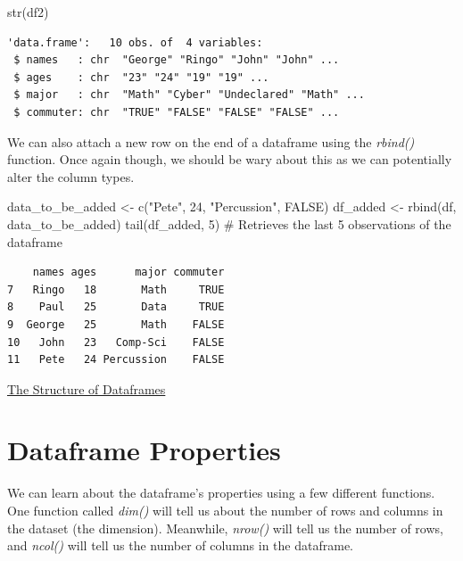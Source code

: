 \documentclass[
  letterpaper,
  DIV=11,
  numbers=noendperiod]{scrreprt}
\newenvironment{Shaded}{\begin{snugshade}}{\end{snugshade}}
\newcommand{\CommentTok}[1]{\textcolor[rgb]{0.37,0.37,0.37}{#1}}
\newcommand{\ConstantTok}[1]{\textcolor[rgb]{0.56,0.35,0.01}{#1}}
\newcommand{\DecValTok}[1]{\textcolor[rgb]{0.68,0.00,0.00}{#1}}
\newcommand{\FunctionTok}[1]{\textcolor[rgb]{0.28,0.35,0.67}{#1}}
\newcommand{\NormalTok}[1]{\textcolor[rgb]{0.00,0.23,0.31}{#1}}
\newcommand{\OtherTok}[1]{\textcolor[rgb]{0.00,0.23,0.31}{#1}}
\newcommand{\StringTok}[1]{\textcolor[rgb]{0.13,0.47,0.30}{#1}}
\begin{document}
\begin{Shaded}
\begin{Highlighting}[]
\FunctionTok{str}\NormalTok{(df2)}
\end{Highlighting}
\end{Shaded}

\begin{verbatim}
'data.frame':   10 obs. of  4 variables:
 $ names   : chr  "George" "Ringo" "John" "John" ...
 $ ages    : chr  "23" "24" "19" "19" ...
 $ major   : chr  "Math" "Cyber" "Undeclared" "Math" ...
 $ commuter: chr  "TRUE" "FALSE" "FALSE" "FALSE" ...
\end{verbatim}

We can also attach a new row on the end of a dataframe using the
\emph{rbind()} function. Once again though, we should be wary about this
as we can potentially alter the column types.

\begin{Shaded}
\begin{Highlighting}[]
\NormalTok{data\_to\_be\_added }\OtherTok{\textless{}{-}} \FunctionTok{c}\NormalTok{(}\StringTok{"Pete"}\NormalTok{, }\DecValTok{24}\NormalTok{, }\StringTok{"Percussion"}\NormalTok{, }\ConstantTok{FALSE}\NormalTok{)}
\NormalTok{df\_added }\OtherTok{\textless{}{-}} \FunctionTok{rbind}\NormalTok{(df, data\_to\_be\_added)}
\FunctionTok{tail}\NormalTok{(df\_added, }\DecValTok{5}\NormalTok{) }\CommentTok{\# Retrieves the last 5 observations of the dataframe}
\end{Highlighting}
\end{Shaded}

\begin{verbatim}
    names ages      major commuter
7   Ringo   18       Math     TRUE
8    Paul   25       Data     TRUE
9  George   25       Math    FALSE
10   John   23   Comp-Sci    FALSE
11   Pete   24 Percussion    FALSE
\end{verbatim}

\begin{watch}{}{}
    \href{https://youtu.be/0BlLEFou1kM}{The Structure of Dataframes}
\end{watch}

\section{Dataframe Properties}\label{dataframe-properties}

We can learn about the dataframe's properties using a few different
functions. One function called \emph{dim()} will tell us about the
number of rows and columns in the dataset (the dimension). Meanwhile,
\emph{nrow()} will tell us the number of rows, and \emph{ncol()} will
tell us the number of columns in the dataframe.
\end{document}
